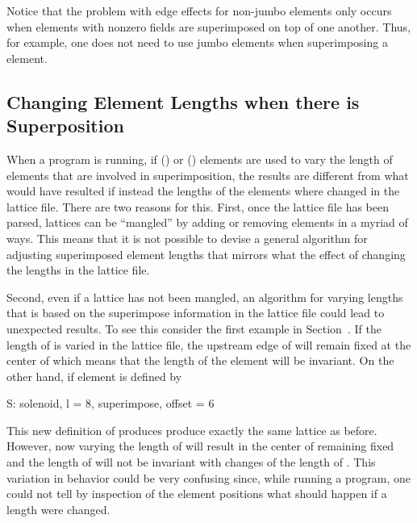 Notice that the problem with edge effects for non-jumbo
 elements only occurs when elements with nonzero
fields are superimposed on top of one another. Thus, for example, one
does not need to use jumbo elements when superimposing a 
element.

\subsection{Changing Element Lengths when there is Superposition}
\label{s:super.length}

When a program is running, if  () or
 () elements are used to vary the length
of elements that are involved in superimposition, the results are
different from what would have resulted if instead the lengths of the
elements where changed in the lattice file. There are two reasons for
this. First, once the lattice file has been parsed, lattices can be
``mangled'' by adding or removing elements in a myriad of ways. This
means that it is not possible to devise a general algorithm for
adjusting superimposed element lengths that mirrors what the effect of
changing the lengths in the lattice file.

Second, even if a lattice has not been mangled, an algorithm for
varying lengths that is based on the superimpose information in the
lattice file could lead to unexpected results. To see this consider
the first example in Section~. If the length of 
is varied in the lattice file, the upstream edge of  will remain
fixed at the center of  which means that the length of the
 element  will be invariant. On the other
hand, if element  is defined by 
\begin{example}
  S: solenoid, l = 8, superimpose, offset = 6
\end{example}
This new definition of  produces produce exactly the same
lattice as before. However, now varying the length of  will
result in the center of  remaining fixed and the length of
 will not be invariant with changes of the length of
. This variation in behavior could be very confusing since,
while running a program, one could not tell by inspection of the
element positions what should happen if a length were changed.

